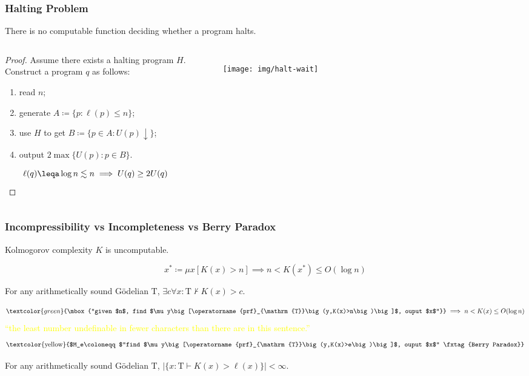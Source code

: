 \documentclass[UTF8,aspectratio=43,11pt,colorlinks,compress,openany]{beamer}%
\begin{document}
\begin{frame}\frametitle{Halting Problem}
	\setlength\abovedisplayskip{0pt}
	\setlength\belowdisplayskip{0pt}
	\begin{theorem}
		There is no computable function deciding whether a program halts.
	\end{theorem}
\begin{columns}
\begin{proof}
	Assume there exists a halting program $H$.\\
	Construct a program $q$ as follows: 
	\begin{enumerate}
		\item read $n$;
		\item generate $A\coloneqq \{p:\ell(p)\leq n\}$;
		\item use $H$ to get $B\coloneqq \{p\in A: U(p)\downarrow\}$;
		\item output $2\max\{U(p): p\in B\}$.
	\end{enumerate}
\[\ell(q)\leqa\log n\lesssim n\implies U(q)\geq 2U(q)\]
\end{proof}
\begin{figure}[H]
	\texttt{[image: img/halt-wait]}
\end{figure}
\end{columns}
\end{frame}

\begin{frame}\frametitle{Incompressibility vs Incompleteness vs Berry Paradox}
	\begin{theorem}[Kolmogorov]
		Kolmogorov complexity $K$ is uncomputable.
	\end{theorem}\vspace{-11pt}
	\[x^*\coloneqq \mu x[K(x)>n]\implies n<K(x^*)\leq O(\log n)\]
	\begin{theorem}[Chaitin]
		For any arithmetically sound G\"odelian $\mathrm{T}$, $\exists c\forall x: \mathrm{T}\nvdash K(x)>c$.
	\end{theorem}\vspace{-17pt}
	\[\textcolor{green}{\mbox{``given $n$, find $\mu y\big[\operatorname{prf}_{\mathrm{T}}\big(y,K(x)>n\big)\big]$, ouput $x$''}}\implies n<K(x)\leq O(\log n)\]
	{\centering\small \textcolor{yellow}{``the least number undefinable in fewer characters than there are in this sentence.''}}
	\[\mbox{\textcolor{yellow}{$M_e\coloneqq $``find $\mu y\big[\operatorname{prf}_{\mathrm{T}}\big(y,K(x)>e\big)\big]$, ouput $x$'' \tag{Berry Paradox}}}\]
	\begin{theorem}[Chaitin]
		For any arithmetically sound G\"odelian $\mathrm{T}$, $\big|\big\{x: \mathrm{T}\vdash K(x)>\ell(x)\big\}\big|<\infty$.
	\end{theorem}
\end{frame}
\end{document}

